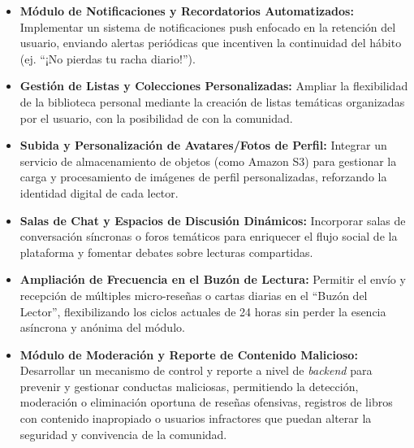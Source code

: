 \documentclass[12pt, atypical, journal]{article}
\begin{document}
\begin{itemize}
	\item \textbf{Módulo de Notificaciones y Recordatorios Automatizados:} Implementar un sistema de notificaciones push enfocado en la retención del usuario, enviando alertas periódicas que incentiven la continuidad del hábito (ej. ``¡No pierdas tu racha diario!'').
	\item \textbf{Gestión de Listas y Colecciones Personalizadas:} Ampliar la flexibilidad de la biblioteca personal mediante la creación de listas temáticas organizadas por el usuario, con la posibilidad de con la comunidad.
	\item \textbf{Subida y Personalización de Avatares/Fotos de Perfil:} Integrar un servicio de almacenamiento de objetos (como Amazon S3) para gestionar la carga y procesamiento de imágenes de perfil personalizadas, reforzando la identidad digital de cada lector.
	\item \textbf{Salas de Chat y Espacios de Discusión Dinámicos:} Incorporar salas de conversación síncronas o foros temáticos para enriquecer el flujo social de la plataforma y fomentar debates sobre lecturas compartidas.
	\item \textbf{Ampliación de Frecuencia en el Buzón de Lectura:} Permitir el envío y recepción de múltiples micro-reseñas o cartas diarias en el ``Buzón del Lector'', flexibilizando los ciclos actuales de 24 horas sin perder la esencia asíncrona y anónima del módulo.
	\item \textbf{Módulo de Moderación y Reporte de Contenido Malicioso:} Desarrollar un mecanismo de control y reporte a nivel de \textit{backend} para prevenir y gestionar conductas maliciosas, permitiendo la detección, moderación o eliminación oportuna de reseñas ofensivas, registros de libros con contenido inapropiado o usuarios infractores que puedan alterar la seguridad y convivencia de la comunidad.
\end{itemize}

\newpage
\end{document}
